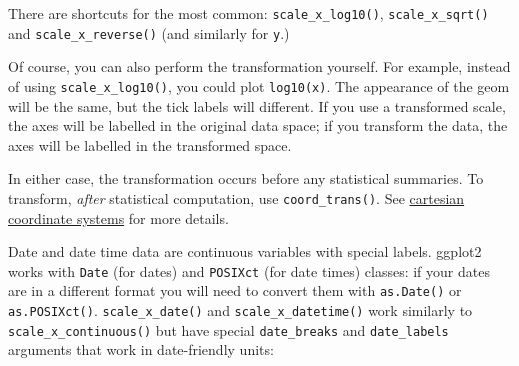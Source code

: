 There are shortcuts for the most common: \texttt{scale\_x\_log10()},
\texttt{scale\_x\_sqrt()} and \texttt{scale\_x\_reverse()} (and
similarly for \texttt{y}.)  

Of course, you can also perform the transformation yourself. For
example, instead of using \texttt{scale\_x\_log10()}, you could plot
\texttt{log10(x)}. The appearance of the geom will be the same, but the
tick labels will different. If you use a transformed scale, the axes
will be labelled in the original data space; if you transform the data,
the axes will be labelled in the transformed space.

In either case, the transformation occurs before any statistical
summaries. To transform, \emph{after} statistical computation, use
\texttt{coord\_trans()}. See \hyperref[sub:cartesian]{cartesian
coordinate systems} for more details.

Date and date time data are continuous variables with special labels.
ggplot2 works with \texttt{Date} (for dates) and \texttt{POSIXct} (for
date times) classes: if your dates are in a different format you will
need to convert them with \texttt{as.Date()} or \texttt{as.POSIXct()}.
  
 
\texttt{scale\_x\_date()} and \texttt{scale\_x\_datetime()} work
similarly to \texttt{scale\_x\_continuous()} but have special
\texttt{date\_breaks} and \texttt{date\_labels} arguments that work in
date-friendly units:

